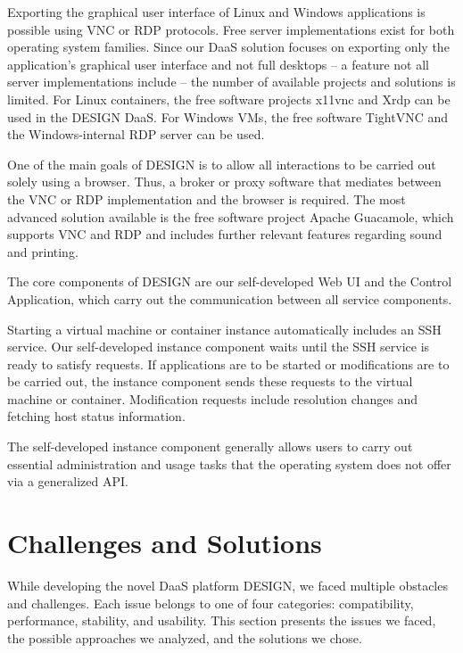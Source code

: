 \documentclass[runningheads]{llncs}
\begin{document}
Exporting the graphical user interface of Linux and Windows applications is possible using VNC or RDP protocols. Free server implementations exist for both operating system families. Since our DaaS solution focuses on exporting only the application's graphical user interface and not full desktops -- a feature not all server implementations include -- the number of available projects and solutions is limited. For Linux containers, the free software projects x11vnc and Xrdp can be used in the DESIGN DaaS. For Windows VMs, the free software TightVNC and the Windows-internal RDP server can be used.

One of the main goals of DESIGN is to allow all interactions to be carried out solely using a browser. Thus, a broker or proxy software that mediates between the VNC or RDP implementation and the browser is required. The most advanced solution available is the free software project Apache Guacamole, which supports VNC and RDP and includes further relevant features regarding sound and printing.

The core components of DESIGN are our self-developed Web UI and the Control Application, which carry out the communication between all service components.

Starting a virtual machine or container instance automatically includes an SSH service. Our self-developed instance component waits until the SSH service is ready to satisfy requests. If applications are to be started or modifications are to be carried out, the instance component sends these requests to the virtual machine or container. Modification requests include resolution changes and fetching host status information.

The self-developed instance component generally allows users to carry out essential administration and usage tasks that the operating system does not offer via a generalized API.



\section{Challenges and Solutions}
\label{sec:AnalysisPossibleComponents}


While developing the novel DaaS platform DESIGN, we faced multiple obstacles and challenges. Each issue belongs to one of four categories: compatibility, performance, stability, and usability. This section presents the issues we faced, the possible approaches we analyzed, and the solutions we chose.
\end{document}
